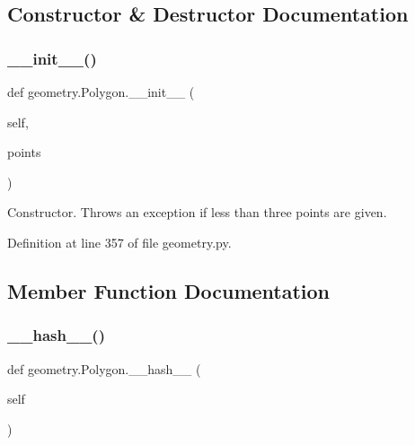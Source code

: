 \subsection{Constructor \& Destructor Documentation}
\mbox{\label{classgeometry_1_1Polygon_a46b21b7c846c26d6ff1171cc9a29d0c5}} 
\subsubsection{\texorpdfstring{\+\_\+\+\_\+init\+\_\+\+\_\+()}{\_\_init\_\_()}}
{\footnotesize\ttfamily def geometry.\+Polygon.\+\_\+\+\_\+init\+\_\+\+\_\+ (\begin{DoxyParamCaption}\item[{}]{self,  }\item[{}]{points }\end{DoxyParamCaption})}

\begin{DoxyVerb}Constructor. Throws an exception if less than three points are given.\end{DoxyVerb}
 

Definition at line 357 of file geometry.\+py.



\subsection{Member Function Documentation}
\mbox{\label{classgeometry_1_1Polygon_ac597f93df5686912dc1ca6eddc65b6b8}} 
\subsubsection{\texorpdfstring{\+\_\+\+\_\+hash\+\_\+\+\_\+()}{\_\_hash\_\_()}}
{\footnotesize\ttfamily def geometry.\+Polygon.\+\_\+\+\_\+hash\+\_\+\+\_\+ (\begin{DoxyParamCaption}\item[{}]{self }\end{DoxyParamCaption})}

